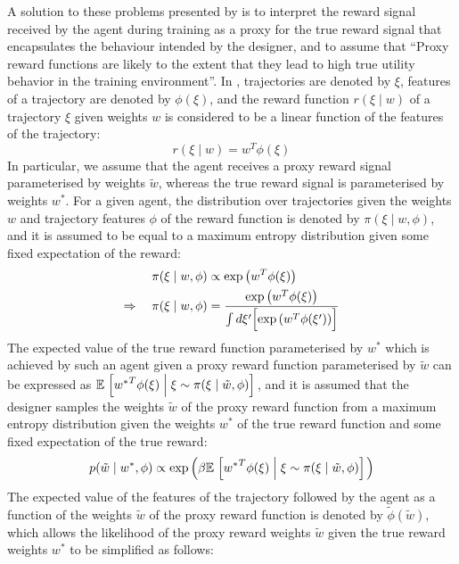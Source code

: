 A solution to these problems presented by \cite{hadfield2017inverse} is to interpret the reward signal received by the agent during training as a proxy for the true reward signal that encapsulates the behaviour intended by the designer, and to assume that ``Proxy reward functions are likely to the extent that they lead to high true utility behavior in the training environment''. In \cite{hadfield2017inverse}, trajectories are denoted by $\xi$, features of a trajectory are denoted by $\phi(\xi)$, and the reward function $r(\xi\mid w)$ of a trajectory $\xi$ given weights $w$ is considered to be a linear function of the features of the trajectory:
\begin{equation*}
    r(\xi\mid w) = w^T \phi(\xi)
\end{equation*}
In particular, we assume that the agent receives a proxy reward signal parameterised by weights $\tilde{w}$, whereas the true reward signal is parameterised by weights $w^*$. For a given agent, the distribution over trajectories given the weights $w$ and trajectory features $\phi$ of the reward function is denoted by $\pi(\xi\mid w, \phi)$, and it is assumed to be equal to a maximum entropy distribution given some fixed expectation of the reward:
\begin{align*}
    \pi(\xi\mid w, \phi) &\propto \exp\left( w^T \phi(\xi) \right) \\
    \Rightarrow \quad \pi(\xi\mid w, \phi) &= \frac{\exp\left( w^T \phi(\xi) \right)}{\int{ d\xi'\Bigl[ \exp\left( w^T \phi(\xi') \right) \Bigr]}}
\end{align*}
The expected value of the true reward function parameterised by $w^*$ which is achieved by such an agent given a proxy reward function parameterised by $\tilde{w}$ can be expressed as $\mathbb{E}\left. \Bigl[ {w^*}^T\phi(\xi) \;\middle\vert\; \xi \sim \pi(\xi\mid \tilde{w}, \phi) \Bigr] \right.$, and it is assumed that the designer samples the weights $\tilde{w}$ of the proxy reward function from a maximum entropy distribution given the weights $w^*$ of the true reward function and some fixed expectation of the true reward:
\begin{equation*}
    p(\tilde{w} \mid w^*, \phi) \propto \exp\left( \beta\mathbb{E}\left. \Bigl[ {w^*}^T\phi(\xi) \;\middle\vert\; \xi \sim \pi(\xi\mid \tilde{w}, \phi) \Bigr] \right. \right)
\end{equation*}
The expected value of the features of the trajectory followed by the agent as a function of the weights $\tilde{w}$ of the proxy reward function is denoted by $\tilde{\phi}(\tilde{w})$, which allows the likelihood of the proxy reward weights $\tilde{w}$ given the true reward weights $w^*$ to be simplified as follows:

